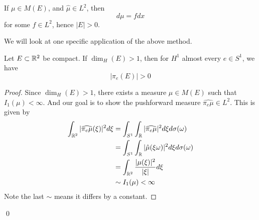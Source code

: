 \begin{corollary}
    If $\mu\in M(E)$, and $\hat{\mu}\in L^2$, then 
    \begin{equation*}
        d\mu=fdx
    \end{equation*}
    for some $f\in L^2$, hence $|E|>0$.
\end{corollary}
We will look at one specific application of the above method.
\begin{theorem}
    Let $E\subset\mathbb{R}^2$ be compact. If $\dim_H(E)>1$, then for $H^1$ almost every $e\in S^1$, we have 
    \begin{equation*}
        |\pi_e(E)|>0
    \end{equation*}
\end{theorem}
\begin{proof}
    Since $\dim_H(E)>1$, there exists a measure $\mu\in M(E)$ such that $I_1(\mu)<\infty$. And our goal is to show the pushforward measure $\widehat{\pi_e\mu}\in L^2$. This is given by 
    \begin{align*}
        \int_{\mathbb{R}^2}|\widehat{\pi_e\mu}(\xi)|^2d\xi&=\int_{S^1}\int_{\mathbb{R}}|\widehat{\pi_e\mu}|^2d\xi d\sigma(\omega)\\
        &=\int_{S^1}\int_{\mathbb{R}}|\hat{\mu}(\xi\omega)|^2d\xi d\sigma(\omega)\\
        &=\int_{\mathbb{R}^2}\frac{|\mu(\xi)|^2}{|\xi|}d\xi\\
        &\sim I_1(\mu)<\infty
    \end{align*}
    Note the last $\sim$ means it differs by a constant.
\end{proof}
\qed

